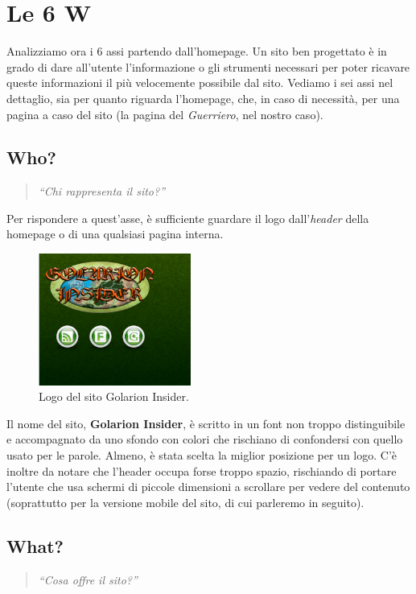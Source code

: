 \section{Le 6 W}

Analizziamo ora i 6 assi partendo dall'homepage. Un sito ben progettato è in grado di 
dare all'utente l'informazione o gli strumenti necessari per poter ricavare queste informazioni
il più velocemente possibile dal sito. Vediamo i sei assi nel dettaglio, sia per quanto riguarda
l'homepage, che, in caso di necessità, per una pagina a caso del sito (la pagina del 
\emph{Guerriero}, nel nostro caso). 

\subsection{Who?}
\begin{quote}
    \emph{``Chi rappresenta il sito?''}
\end{quote}
Per rispondere a quest'asse, è sufficiente guardare il logo dall'\emph{header} della homepage o di 
una qualsiasi pagina interna.
\begin{figure}[hbt]
    \centering
    \includegraphics[width=5cm]{img/logo.png}
    \caption{Logo del sito Golarion Insider.}
\end{figure}

Il nome del sito, \textbf{Golarion Insider}, è scritto in un font non troppo distinguibile e accompagnato da uno sfondo 
con colori che rischiano di confondersi con quello usato per le parole. Almeno, è stata scelta la miglior posizione per un logo.
C'è inoltre da notare che l'header occupa forse troppo spazio, rischiando di portare l'utente che usa schermi di piccole dimensioni
a scrollare per vedere del contenuto
(soprattutto per la versione mobile del sito, di cui parleremo in seguito).

\subsection{What?}
\begin{quote}
    \emph{``Cosa offre il sito?''}
\end{quote}

